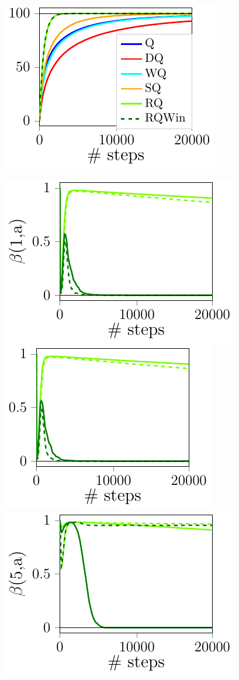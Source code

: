 \documentclass[portrait,a0paper,fontscale=0.312]{baposter}
\begin{document}
\begin{poster}
{\begin{center}
\begin{minipage}{0.33\textwidth}
    \includegraphics[scale=0.55]{./imgs/doubleChain/v5-51.pdf}
  \end{minipage}
  \hfill
  \begin{minipage}{0.33\textwidth}
    \includegraphics[scale=0.55]{./imgs/doubleChain/lrs1-1.pdf}
    \includegraphics[scale=0.55]{./imgs/doubleChain/lrs1-51.pdf}\\
    \includegraphics[scale=0.55]{./imgs/doubleChain/lrs5-1.pdf}

\end{minipage}
\end{center}}
\end{poster}
\end{document}
